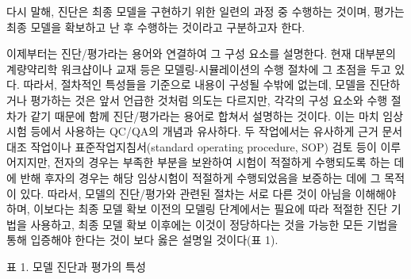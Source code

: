 \documentclass[
  10pt,
]{krantz}
\begin{document}
다시 말해, 진단은 최종 모델을 구현하기 위한 일련의 과정 중 수행하는 것이며, 평가는 최종 모델을 확보하고 난 후 수행하는
것이라고 구분하고자 한다.

이제부터는 진단/평가라는 용어와 연결하여 그 구성 요소를 설명한다. 현재 대부분의 계량약리학 워크샵이나 교재 등은
모델링-시뮬레이션의 수행 절차에 그 초점을 두고 있다. 따라서, 절차적인 특성들을 기준으로 내용이
구성될 수밖에 없는데, 모델을 진단하거나 평가하는 것은 앞서 언급한 것처럼 의도는 다르지만, 각각의 구성 요소와 수행
절차가 같기 때문에 함께 진단/평가라는 용어로 합쳐서 설명하는 것이다. 이는 마치 임상시험 등에서 사용하는 QC/QA의
개념과 유사하다. 두 작업에서는 유사하게 근거 문서 대조 작업이나 표준작업지침서(standard operating
procedure, SOP) 검토 등이 이루어지지만, 전자의 경우는 부족한 부분을 보완하여 시험이 적절하게 수행되도록 하는 데에
반해 후자의 경우는 해당 임상시험이 적절하게 수행되었음을 보증하는 데에 그 목적이 있다. 따라서, 모델의 진단/평가와 관련된
절차는 서로 다른 것이 아님을 이해해야 하며, 이보다는 최종 모델 확보 이전의 모델링 단계에서는 필요에 따라 적절한 진단
기법을 사용하고, 최종 모델 확보 이후에는 이것이 정당하다는 것을 가능한 모든 기법을 통해 입증해야 한다는 것이 보다
옳은 설명일 것이다(표 1).

표 1. 모델 진단과 평가의 특성
\end{document}
